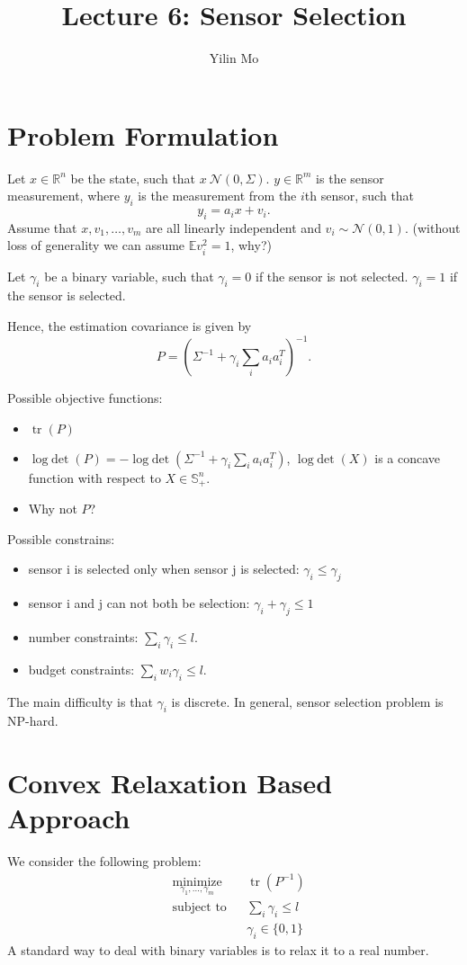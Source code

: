 \documentclass{article}
\title{Lecture 6: Sensor Selection}
\author{Yilin Mo}
\DeclareMathOperator*{\tr}{tr}     %
\DeclareMathOperator{\logdet}{log\;det}
\begin{document}
 \maketitle
\section{Problem Formulation}
Let $x\in \mathbb R^n$ be the state, such that $x~\mathcal N(0,\Sigma)$. $y\in \mathbb R^m$ is the sensor measurement, where $y_i$ is the measurement from the $i$th sensor, such that
\begin{displaymath}
 y_i = a_i x + v_i.
\end{displaymath}
Assume that $x,v_1,\dots,v_m$ are all linearly independent and $v_i\sim \mathcal N(0,1)$. (without loss of generality we can assume $\mathbb Ev_i^2 = 1$, why?)

Let $\gamma_i$ be a binary variable, such that $\gamma_i = 0$ if the sensor is not selected. $\gamma_i = 1$ if the sensor is selected.

Hence, the estimation covariance is given by
\begin{displaymath}
  P = \left( \Sigma^{-1} + \gamma_i \sum_i a_ia_i^T \right)^{-1}.
\end{displaymath}

Possible objective functions:
\begin{itemize}
  \item $\tr(P)$
  \item $\logdet(P) = - \logdet( \Sigma^{-1} + \gamma_i \sum_i a_ia_i^T )$, $\logdet(X)$ is a concave function with respect to $X\in \mathbb S_+^n$.
  \item Why not $P$?
\end{itemize}
Possible constrains:
\begin{itemize}
  \item sensor i is selected only when sensor j is selected: $\gamma_i \leq \gamma_j$
  \item sensor i and j can not both be selection: $\gamma_i + \gamma_j \leq 1$
  \item number constraints: $\sum_i \gamma_i \leq l$.
  \item budget constraints: $\sum_i w_i \gamma_i \leq l$.
\end{itemize}
The main difficulty is that $\gamma_i$ is discrete. In general, sensor selection problem is NP-hard.
\section{Convex Relaxation Based Approach}
We consider the following problem:
    \begin{align*}
      &\mathop{\textrm{minimize}}\limits_{\gamma_1,\dots,\gamma_m}&
      & \tr( P^{-1})\nonumber\\
      &\textrm{subject to}&
      & \sum_i \gamma_i\leq l\\
      &&&\gamma_i \in\{0,1\}
    \end{align*}
A standard way to deal with binary variables is to relax it to a real number. 
\end{document}
